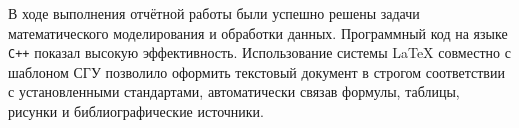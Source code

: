 В ходе выполнения отчётной работы были успешно решены задачи математического моделирования и обработки данных. Программный код на языке \texttt{C++} показал высокую эффективность. Использование системы \LaTeX{} совместно с шаблоном СГУ позволило оформить текстовый документ в строгом соответствии с установленными стандартами, автоматически связав формулы, таблицы, рисунки и библиографические источники.